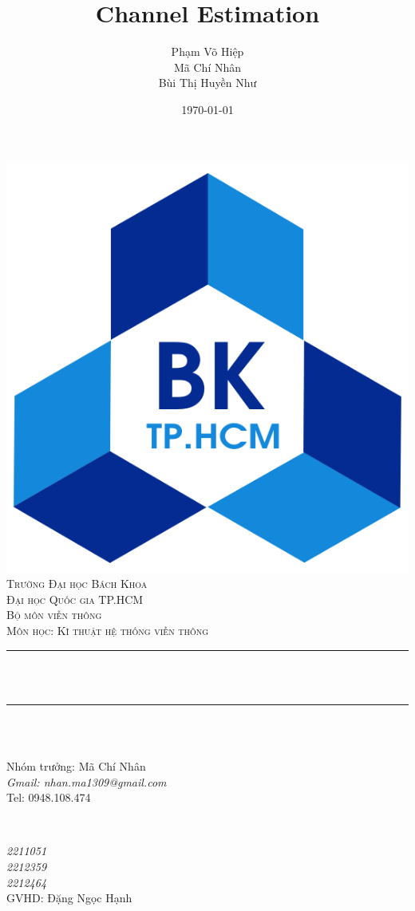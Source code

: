 \documentclass{article}
\title{Channel Estimation}
\author{
  Phạm Võ Hiệp \\
  Mã Chí Nhân \\
  Bùi Thị Huyền Như\\
}
\date{\today}
\makeatletter
\let\thetitle\@title
\let\theauthor\@author
\makeatother
\begin{document}
\begin{titlepage}
    \centering
    \includegraphics[scale=0.35]{photo/logo.png}\\[1.0 cm]
    \textsc{\LARGE Trường Đại học Bách Khoa\\ Đại học Quốc gia TP.HCM}\\[1.5 cm]
    
    \textsc{\Large Bộ môn viễn thông}\\[0.5 cm]
    \textsc{\large Môn học: Kĩ thuật hệ thống viễn thông}\\[0.5 cm]
    \rule{\linewidth}{0.2 mm} \\[0.4 cm]
    {\huge \bfseries \thetitle}\\
    \rule{\linewidth}{0.2 mm} \\[1.5 cm]

    \begin{minipage}{0.4\textwidth}
        \begin{flushleft} \large
            \theauthor \\
            \vspace{0.3 cm}
            {\small Nhóm trưởng: Mã Chí Nhân\\}
            \textit{\small Gmail: nhan.ma1309@gmail.com}\\
            {\small Tel: 0948.108.474}
        \end{flushleft}
    \end{minipage}~
    \begin{minipage}{0.4\textwidth}
        \begin{flushright} \large
            \emph{2211051\\2212359\\2212464} \\
            \vspace{1 cm}
            {\small GVHD: Đặng Ngọc Hạnh}
        \end{flushright}    
    \end{minipage}\\[2 cm]
    

\end{titlepage}
\end{document}
